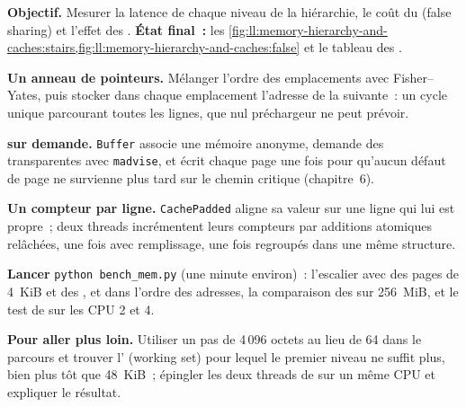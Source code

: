 \begin{tutorial}
\textbf{Objectif.} Mesurer la latence de chaque niveau de la hiérarchie, le coût du  (false sharing) et l'effet des . \textbf{État final~:} les \cref{fig:ll:memory-hierarchy-and-caches:stairs,fig:ll:memory-hierarchy-and-caches:false} et
le tableau des .
\begin{tutsteps}
\item \textbf{Un anneau de pointeurs.} Mélanger l'ordre des emplacements avec Fisher--Yates, puis stocker dans chaque emplacement l'adresse de la
suivante~: un cycle unique parcourant toutes les lignes, que nul préchargeur ne peut prévoir.
\label{lst:ll:memory-hierarchy-and-caches:chase}
\item \textbf{ sur demande.} \texttt{Buffer} associe une mémoire anonyme, demande des  transparentes avec
\texttt{madvise}, et écrit chaque page une fois pour qu'aucun défaut de page ne survienne plus tard sur le chemin critique (chapitre~6).
\label{lst:ll:memory-hierarchy-and-caches:buffer}
\item \textbf{Un compteur par ligne.} \texttt{CachePadded} aligne sa valeur sur une ligne qui lui est propre~; deux threads incrémentent
leurs compteurs par additions atomiques relâchées, une fois avec remplissage, une fois regroupés dans une même structure.
\label{lst:ll:memory-hierarchy-and-caches:padded}
\item \textbf{Lancer} \texttt{python bench\_mem.py} (une minute environ)~: l'escalier avec des pages de 4~KiB et des , et dans l'ordre des
adresses, la comparaison des  sur 256~MiB, et le test de  sur les CPU 2 et 4.
\end{tutsteps}
\textbf{Pour aller plus loin.} Utiliser un pas de 4\,096 octets au lieu de 64 dans le parcours et trouver l' (working set) pour lequel
le premier niveau ne suffit plus, bien plus tôt que 48~KiB~; épingler les deux threads de  sur un même CPU et expliquer le résultat.
\end{tutorial}

